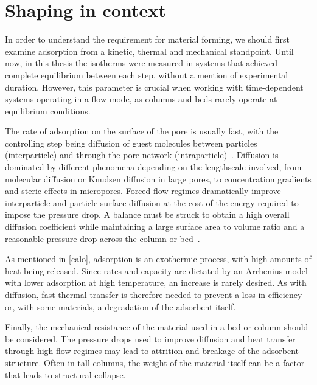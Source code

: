 
\section{Shaping in context}

In order to understand the requirement for material forming, 
we should first examine adsorption from 
a kinetic, thermal and mechanical standpoint. 
Until now, in this thesis the isotherms were measured in systems
that achieved complete equilibrium between each step, without 
a mention of experimental duration. However, this parameter is crucial
when working with time-dependent systems operating in a
flow mode, as columns and beds rarely operate at equilibrium
conditions.

The rate of adsorption on the surface of the pore is usually fast, 
with the controlling step being diffusion of guest molecules between 
particles (interparticle) and through the pore network 
(intraparticle)~\cite{ruthvenPressureSwingAdsorption1994}.
Diffusion is dominated by different phenomena depending on the
lengthscale involved, from molecular diffusion or Knudsen diffusion
in large pores, to concentration gradients and steric effects in
micropores. Forced flow regimes dramatically improve interparticle
and particle surface diffusion at the cost of the energy required
to impose the pressure drop. A balance must be struck to obtain a 
high overall diffusion coefficient while maintaining a large surface 
area to volume ratio and a reasonable pressure drop across the 
column or bed~\cite{mitchellAdvancedVisualizationStrategies2013}.

As mentioned in \autoref{calo}, adsorption is an exothermic process,
with high amounts of heat being released. Since rates and 
capacity are dictated by an Arrhenius model with lower adsorption
at high temperature, an increase is rarely desired. 
As with diffusion, fast thermal transfer is therefore needed
to prevent a loss in efficiency or, with some materials, a degradation
of the adsorbent itself.

Finally, the mechanical resistance of the material used in a 
bed or column should be considered. The pressure drops 
used to improve diffusion and heat transfer through high
flow regimes may lead to attrition and breakage of the 
adsorbent structure. Often in tall columns, the weight of the 
material itself can be a factor that leads to structural
collapse.

